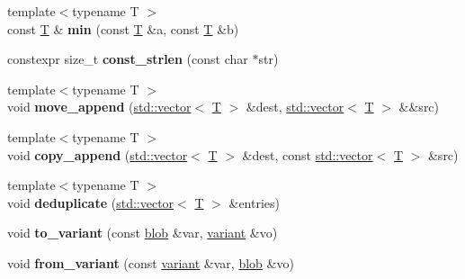 \begin{DoxyCompactItemize}
\item 
\mbox{\label{namespacefc_a1a3af75b0f96790be79c437163e11fd4}} 
{\footnotesize template$<$typename T $>$ }\\const \mbox{\hyperlink{struct_t}{T}} \& {\bfseries min} (const \mbox{\hyperlink{struct_t}{T}} \&a, const \mbox{\hyperlink{struct_t}{T}} \&b)
\item 
\mbox{\label{namespacefc_a3ef687c18276fdf95a78c568b0b27a32}} 
constexpr size\+\_\+t {\bfseries const\+\_\+strlen} (const char $\ast$str)
\item 
\mbox{\label{namespacefc_adf117149dd88168405e7c46329018bc5}} 
{\footnotesize template$<$typename T $>$ }\\void {\bfseries move\+\_\+append} (\mbox{\hyperlink{classstd_1_1vector}{std\+::vector}}$<$ \mbox{\hyperlink{struct_t}{T}} $>$ \&dest, \mbox{\hyperlink{classstd_1_1vector}{std\+::vector}}$<$ \mbox{\hyperlink{struct_t}{T}} $>$ \&\&src)
\item 
\mbox{\label{namespacefc_aecdca8dead15095c03ee28a6914ce0a6}} 
{\footnotesize template$<$typename T $>$ }\\void {\bfseries copy\+\_\+append} (\mbox{\hyperlink{classstd_1_1vector}{std\+::vector}}$<$ \mbox{\hyperlink{struct_t}{T}} $>$ \&dest, const \mbox{\hyperlink{classstd_1_1vector}{std\+::vector}}$<$ \mbox{\hyperlink{struct_t}{T}} $>$ \&src)
\item 
\mbox{\label{namespacefc_a66fb10ab364a875128ef47e1a0e4c940}} 
{\footnotesize template$<$typename T $>$ }\\void {\bfseries deduplicate} (\mbox{\hyperlink{classstd_1_1vector}{std\+::vector}}$<$ \mbox{\hyperlink{struct_t}{T}} $>$ \&entries)
\item 
\mbox{\label{namespacefc_ae9a6b5d0aae6d786ded7a54efa134a66}} 
void {\bfseries to\+\_\+variant} (const \mbox{\hyperlink{structfc_1_1blob}{blob}} \&var, \mbox{\hyperlink{classfc_1_1variant}{variant}} \&vo)
\item 
\mbox{\label{namespacefc_a1643a6b4ea1a19e7d5298117a7fd1d10}} 
void {\bfseries from\+\_\+variant} (const \mbox{\hyperlink{classfc_1_1variant}{variant}} \&var, \mbox{\hyperlink{structfc_1_1blob}{blob}} \&vo)

\end{DoxyCompactItemize}
